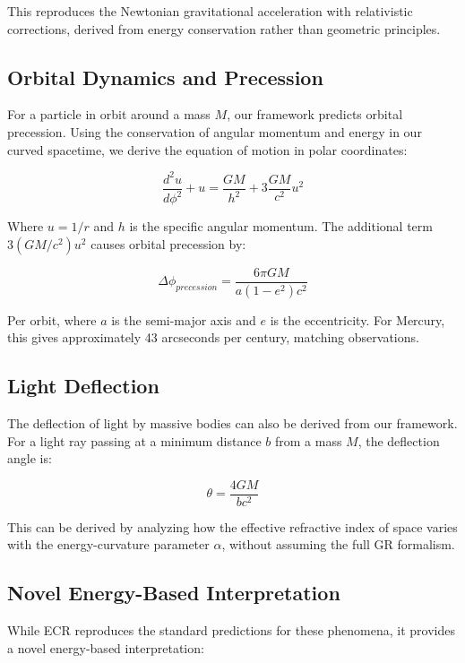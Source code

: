 \documentclass[11pt,a4paper]{article}
\begin{document}
This reproduces the Newtonian gravitational acceleration with relativistic corrections, derived from energy conservation rather than geometric principles.

\subsection{Orbital Dynamics and Precession}
For a particle in orbit around a mass $M$, our framework predicts orbital precession. Using the conservation of angular momentum and energy in our curved spacetime, we derive the equation of motion in polar coordinates:

\begin{equation}
    \frac{d^2u}{d\phi^2} + u = \frac{GM}{h^2} + 3\frac{GM}{c^2}u^2
\end{equation}

Where $u = 1/r$ and $h$ is the specific angular momentum. The additional term $3(GM/c^2)u^2$ causes orbital precession by:

\begin{equation}
    \Delta\phi_{precession} = \frac{6\pi GM}{a(1-e^2)c^2}
\end{equation}

Per orbit, where $a$ is the semi-major axis and $e$ is the eccentricity. For Mercury, this gives approximately 43 arcseconds per century, matching observations.

\subsection{Light Deflection}
The deflection of light by massive bodies can also be derived from our framework. For a light ray passing at a minimum distance $b$ from a mass $M$, the deflection angle is:

\begin{equation}
    \theta = \frac{4GM}{bc^2}
\end{equation}

This can be derived by analyzing how the effective refractive index of space varies with the energy-curvature parameter $\alpha$, without assuming the full GR formalism.

\subsection{Novel Energy-Based Interpretation}
While ECR reproduces the standard predictions for these phenomena, it provides a novel energy-based interpretation:
\end{document}
